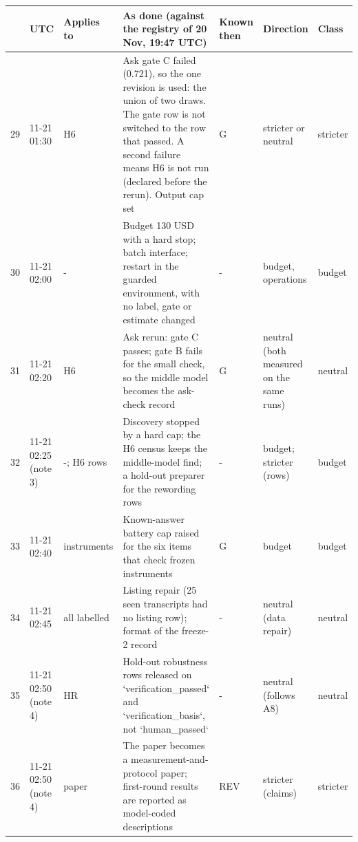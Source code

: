 {\tiny\setlength{\tabcolsep}{2pt}
\begin{tabular}{@{}rp{}p{}p{}p{}p{}l@{}}
\toprule
 & UTC & Applies to & As done (against the registry of 20 Nov, 19:47 UTC) & Known then & Direction & Class \\
\midrule
29 & 11-21 01:30 & H6 & Ask gate C failed (0.721), so the one revision is used: the union of two draws. The gate row is not switched to the row that passed. A second failure means H6 is not run (declared before the rerun). Output cap set & G & stricter or neutral & stricter \\
30 & 11-21 02:00 & - & Budget 130 USD with a hard stop; batch interface; restart in the guarded environment, with no label, gate or estimate changed & - & budget, operations & budget \\
31 & 11-21 02:20 & H6 & Ask rerun: gate C passes; gate B fails for the small check, so the middle model becomes the ask-check record & G & neutral (both measured on the same runs) & neutral \\
32 & 11-21 02:25 (note 3) & -; H6 rows & Discovery stopped by a hard cap; the H6 census keeps the middle-model find; a hold-out preparer for the rewording rows & - & budget; stricter (rows) & budget \\
33 & 11-21 02:40 & instruments & Known-answer battery cap raised for the six items that check frozen instruments & G & budget & budget \\
34 & 11-21 02:45 & all labelled & Listing repair (25 seen transcripts had no listing row); format of the freeze-2 record & - & neutral (data repair) & neutral \\
35 & 11-21 02:50 (note 4) & HR & Hold-out robustness rows released on `verification\_passed` and `verification\_basis`, not `human\_passed` & - & neutral (follows A8) & neutral \\
36 & 11-21 02:50 (note 4) & paper & The paper becomes a measurement-and-protocol paper; first-round results are reported as model-coded descriptions & REV & stricter (claims) & stricter \\

\end{tabular}}
